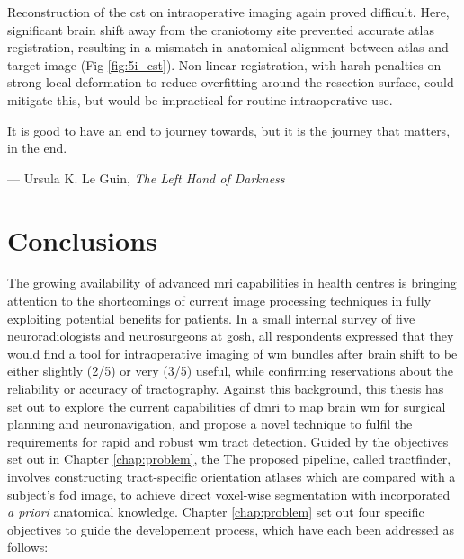 \documentclass[12pt,phd,a4paper,twoside]{ucl_thesis}
\newcommand\epigraph[2]{\begin{flushright}
    \parbox{0.75\textwidth}{\raggedleft #1}
    \vskip 1.5\baselineskip
    --- #2
  \end{flushright}}
\newcommand\epipage[2]{\clearpage\thispagestyle{empty}
  \vspace*{\fill}
  {\sffamily\epigraph{#1}{#2}}
  \vspace*{\fill}\pagebreak
}
\providecommand{\DIFaddtex}[1]{{\protect\color{blue} \sf #1}} %
\providecommand{\DIFdeltex}[1]{{\protect\color{red} \scriptsize #1}} %
\providecommand{\DIFaddbegin}{} %
\providecommand{\DIFaddend}{} %
\providecommand{\DIFdelbegin}{} %
\providecommand{\DIFdelend}{} %
\providecommand{\DIFadd}[1]{\texorpdfstring{\DIFaddtex{#1}}{#1}} %
\providecommand{\DIFdel}[1]{\texorpdfstring{\DIFdeltex{#1}}{}} %
\newcommand{\DIFscaledelfig}{0.5}
\newlength{\DIFdelgraphicswidth} %
\newlength{\DIFdelgraphicsheight} %
\newcommand{\DIFaddincludegraphics}[2][]{{\color{blue}\fbox{\DIFOincludegraphics[#1]{#2}}}} %
\newcommand{\DIFdelincludegraphics}[2][]{%
\sbox{\DIFdelgraphicsbox}{\DIFOincludegraphics[#1]{#2}}%
\settoboxwidth{\DIFdelgraphicswidth}{\DIFdelgraphicsbox} %
\settoboxtotalheight{\DIFdelgraphicsheight}{\DIFdelgraphicsbox} %
\scalebox{\DIFscaledelfig}{%
\parbox[b]{\DIFdelgraphicswidth}{\usebox{\DIFdelgraphicsbox}\\[-\baselineskip] \rule{\DIFdelgraphicswidth}{0em}}\llap{\resizebox{\DIFdelgraphicswidth}{\DIFdelgraphicsheight}{%
\setlength{\unitlength}{\DIFdelgraphicswidth}%
\begin{picture}(1,1)%
\thicklines\linethickness{2pt} %
{\color[rgb]{1,0,0}\put(0,0){\framebox(1,1){}}}%
{\color[rgb]{1,0,0}\put(0,0){\line( 1,1){1}}}%
{\color[rgb]{1,0,0}\put(0,1){\line(1,-1){1}}}%
\end{picture}%
}\hspace*{3pt}}} %
} %
\DeclareRobustCommand{\DIFaddbegin}{\DIFOaddbegin \let\includegraphics\DIFaddincludegraphics} %
\DeclareRobustCommand{\DIFaddend}{\DIFOaddend \let\includegraphics\DIFOincludegraphics} %
\DeclareRobustCommand{\DIFdelbegin}{\DIFOdelbegin \let\includegraphics\DIFdelincludegraphics} %
\DeclareRobustCommand{\DIFdelend}{\DIFOaddend \let\includegraphics\DIFOincludegraphics} %
\begin{document}
Reconstruction of the \gls{cst} on intraoperative imaging again proved difficult.
Here, significant brain shift away from the craniotomy site prevented accurate atlas registration, resulting in a mismatch in anatomical alignment between atlas and target image (Fig \ref{fig:5i_cst}).
Non-linear registration, with harsh penalties on strong local deformation to reduce overfitting around the resection surface, could mitigate this, but would be impractical for routine intraoperative use.
\clearpage{}

\epipage{It is good to have an end to journey towards, but it is the journey that matters, in the end.}{Ursula K. Le Guin, \textit{The Left Hand of Darkness}}
\clearpage{}\chapter{Conclusions}
\DIFdelbegin %
\DIFdelend 

The growing availability of advanced \gls{mri} capabilities in health centres is bringing attention to the shortcomings of current image processing techniques in fully exploiting potential benefits for patients.
In a small internal survey of five neuroradiologists and neurosurgeons at \gls{gosh}, all respondents expressed that they would find a tool for intraoperative imaging of \gls{wm} bundles after brain shift to be either slightly (2/5) or very (3/5) useful, while confirming reservations about the reliability or accuracy of tractography.
Against this background, this thesis has set out to explore the current capabilities of \gls{dmri} to map brain \gls{wm} for surgical planning and neuronavigation, and propose a novel technique to fulfil the requirements for rapid and robust \gls{wm} tract detection.
\DIFdelbegin \DIFdel{Guided by the objectives set out in Chapter \ref{chap:problem}, the }\DIFdelend \DIFaddbegin \DIFadd{The }\DIFaddend proposed pipeline, called tractfinder, involves constructing tract-specific orientation atlases which are compared with a subject's \gls{fod} image, to achieve direct voxel-wise segmentation with incorporated \textit{a priori} anatomical knowledge.
\DIFaddbegin \DIFadd{Chapter \ref{chap:problem} set out four specific objectives to guide the developement process, which have each been addressed as follows:
}
\end{document}
